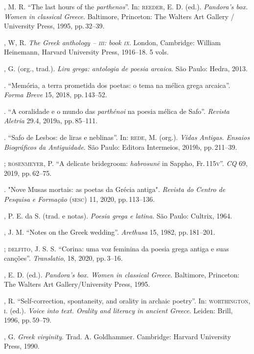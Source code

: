 \begin{bibliohedra}
, M. R. “The last hours of the \textit{parthenos}”. In: \textsc{reeder}, E. D. (ed.). \textit{Pandora’s box. Women in classical Greece}. Baltimore, Princeton: The Walters Art Gallery / University Press, 1995, pp.\,32--39. 

, W, R. \textit{The Greek anthology -- \textsc{iii}: book \textsc{ix}}. London, Cambridge: William Heinemann, Harvard University Press, 1916--18. 5 vols.

, G. (org., trad.). \textit{Lira grega: antologia de poesia arcaica}. São Paulo: Hedra, 2013.

\titidem. “Memória, a terra prometida dos poetas: o tema na mélica grega arcaica”. \textit{Forma Breve} 15, 2018, pp.\,143--52. 

\titidem. “A coralidade e o mundo das \textit{parthénoi} na poesia mélica de Safo”. \textit{Revista Aletria} 29.4, 2019a, pp.\,85--111. 

\titidem. “Safo de Lesbos: de liras e neblinas”. In: \textsc{rede}, M. (org.). \textit{Vidas Antigas. Ensaios Biográficos da Antiguidade}. São Paulo: Editora Intermeios, 2019b, pp.\,211--39.

\titidem; \textsc{rosenmeyer}, P. “A delicate bridegroom: \textit{habrosunē} in Sappho, Fr.\,115\textsc{v}”. \textit{CQ} 69, 2019, pp.\,62--75.

\titidem. "Nove Musas mortais: as poetas da Grécia antiga". \textit{Revista do Centro de Pesquisa e Formação} (\textsc{sesc}) 11, 2020, pp.\,113--136.

, P. E. da S. (trad. e notas). \textit{Poesia grega e latina}. São Paulo: Cultrix, 1964.

, J. M. “Notes on the Greek wedding”. \textit{Arethusa} 15, 1982, pp.\,181--201. 

\titidem; \textsc{delfito}, J. S. S. “Corina: uma voz feminina da poesia grega antiga e suas canções”. \textit{Translatio},  18, 2020, pp.\,3--16.

, E. D. (ed.). \textit{Pandora’s box. Women in classical Greece}. Baltimore, Princeton: The Walters Art Gallery/University Press, 1995.


, R. “Self-correction, spontaneity, and orality in archaic poetry”. In: \textsc{worthington}, \textsc{i}. (ed.). \textit{Voice into text. Orality and literacy in ancient Greece}. Leiden: Brill, 1996, pp.\,59--79.

, G. \textit{Greek virginity}. Trad. A. Goldhammer. Cambridge: Harvard University Press, 1990.


\end{bibliohedra}
